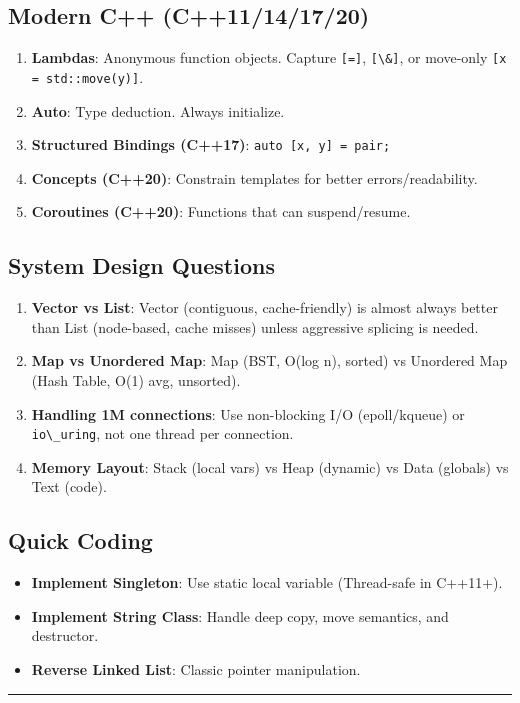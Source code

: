 \hypertarget{modern-c-c11141720}{%
\subsection{Modern C++ (C++11/14/17/20)}\label{modern-c-c11141720}}

\begin{enumerate}
\def\labelenumi{\arabic{enumi}.}
\tightlist
\item
  \textbf{Lambdas}: Anonymous function objects. Capture
  \passthrough{\lstinline![=]!}, \passthrough{\lstinline![\&]!}, or
  move-only \passthrough{\lstinline![x = std::move(y)]!}.
\item
  \textbf{Auto}: Type deduction. Always initialize.
\item
  \textbf{Structured Bindings (C++17)}:
  \passthrough{\lstinline!auto [x, y] = pair;!}
\item
  \textbf{Concepts (C++20)}: Constrain templates for better
  errors/readability.
\item
  \textbf{Coroutines (C++20)}: Functions that can suspend/resume.
\end{enumerate}

\hypertarget{system-design-questions}{%
\subsection{System Design Questions}\label{system-design-questions}}

\begin{enumerate}
\def\labelenumi{\arabic{enumi}.}
\tightlist
\item
  \textbf{Vector vs List}: Vector (contiguous, cache-friendly) is almost
  always better than List (node-based, cache misses) unless aggressive
  splicing is needed.
\item
  \textbf{Map vs Unordered Map}: Map (BST, O(log n), sorted) vs
  Unordered Map (Hash Table, O(1) avg, unsorted).
\item
  \textbf{Handling 1M connections}: Use non-blocking I/O (epoll/kqueue)
  or \passthrough{\lstinline!io\_uring!}, not one thread per connection.
\item
  \textbf{Memory Layout}: Stack (local vars) vs Heap (dynamic) vs Data
  (globals) vs Text (code).
\end{enumerate}

\hypertarget{quick-coding}{%
\subsection{Quick Coding}\label{quick-coding}}

\begin{itemize}
\tightlist
\item
  \textbf{Implement Singleton}: Use static local variable (Thread-safe
  in C++11+).
\item
  \textbf{Implement String Class}: Handle deep copy, move semantics, and
  destructor.
\item
  \textbf{Reverse Linked List}: Classic pointer manipulation.
\end{itemize}

\begin{center}\rule{0.5\linewidth}{0.5pt}\end{center}
